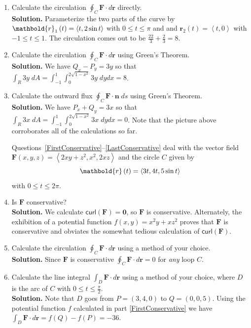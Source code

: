 \documentclass[12pt]{article}
\let\cos\relax\DeclareMathOperator{\cos}{\mathsf{cos}}
\begin{document}
\begin{enumerate}
\item\label{FirstEllipse}
Calculate the circulation $\oint_C\mathbold{F}
\cdot d\mathbold{r}$ directly.\\
{\bf Solution.} Parameterize the two parts of the curve
by $\mathbold{r}_1\left(t\right)=\left\langle\cos{t},2\sin{t}\right\rangle$
with $0\le t\le \pi$ and
and $\mathbold{r}_2\left(t\right)=\left\langle t,0\right\rangle$
with $-1\le t\le 1$. The circulation comes out to be $\frac{22}{3}+\frac{2}{3}
=8$.

\item Calculate the circulation $\oint_C\mathbold{F}
\cdot d\mathbold{r}$ using Green's Theorem.\\
{\bf Solution.} We have $Q_x-P_y=3y$ so that
$\int_R3y\;dA=\int_{-1}^1\int_0^{2\sqrt{1-x^2}}3y\;dydx=8$.

\item\label{LastEllipse} Calculate the outward flux $\oint_C\mathbold{F}
\cdot\mathbold{n}\;ds$ using Green's Theorem.\\
{\bf Solution.} We have $P_x+Q_y=3x$ so that
$\int_R3x\;dA=\int_{-1}^1\int_0^{2\sqrt{1-x^2}}3x\;dydx=0$.
Note that the picture above corroborates all of the calculations so far.
\newpage

Questions~\ref{FirstConservative}--\ref{LastConservative}
deal with
the vector field $\mathbold{F}\left(x,y,z\right)
=\left\langle 2xy+z^2,x^2,2xz\right\rangle$
and the circle $C$ given by
\[\mathbold{r}\left(t\right)=\left\langle
3\cos{t},4\cos{t},5\sin{t}\right\rangle\]
with $0\le t\le 2\pi$.

\item\label{FirstConservative} Is $\mathbold{F}$ conservative?\\
{\bf Solution.} We calculate $\mathsf{curl}\left(\mathbold{F}\right)
=\mathbold{0}$, so $\mathbold{F}$ is conservative.
Alternately, the exhibition of a potential function
$f\left(x,y\right)=x^2y+xz^2$ proves that $\mathbold{F}$ is conservative
and obviates the somewhat tedious calculation of
$\mathsf{curl}\left(\mathbold{F}\right)$.

\item Calculate the circulation $\oint_C\mathbold{F}
\cdot d\mathbold{r}$ using a method of your choice.\\
{\bf Solution.} Since $\mathbold{F}$ is conservative
$\oint_C\mathbold{F} \cdot d\mathbold{r}=0$ for {\em any} loop $C$.

\item\label{LastConservative}
Calculate the line integral $\int_D\mathbold{F}
\cdot d\mathbold{r}$ using a method of your choice,
where $D$ is the arc of $C$ with $0\le t\le\frac{\pi}{2}$.\\
{\bf Solution.} Note that $D$ goes from $P=\left(3,4,0\right)$
to $Q=\left(0,0,5\right)$. Using the potential function $f$
calculated in part \ref{FirstConservative} we have
$\int_D\mathbold{F} \cdot d\mathbold{r}=f\left(Q\right)-f\left(P\right)
=-36$.
\end{enumerate}
\end{document}
